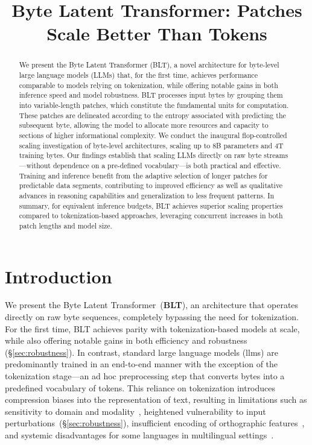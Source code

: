 \title{Byte Latent Transformer: Patches Scale Better Than Tokens}

\begin{abstract}
We present the Byte Latent Transformer ({\textsc BLT}), a novel architecture for byte-level large language models (LLMs) that, for the first time, achieves performance comparable to models relying on tokenization, while offering notable gains in both inference speed and model robustness. {\textsc BLT} processes input bytes by grouping them into variable-length patches, which constitute the fundamental units for computation. These patches are delineated according to the entropy associated with predicting the subsequent byte, allowing the model to allocate more resources and capacity to sections of higher informational complexity. We conduct the inaugural flop-controlled scaling investigation of byte-level architectures, scaling up to 8B parameters and 4T training bytes. Our findings establish that scaling LLMs directly on raw byte streams—without dependence on a pre-defined vocabulary—is both practical and effective. Training and inference benefit from the adaptive selection of longer patches for predictable data segments, contributing to improved efficiency as well as qualitative advances in reasoning capabilities and generalization to less frequent patterns. In summary, for equivalent inference budgets, {\textsc BLT} achieves superior scaling properties compared to tokenization-based approaches, leveraging concurrent increases in both patch lengths and model size.
\end{abstract}

\section{Introduction}
\label{section:intro}

We present the Byte Latent Transformer~(\textbf{BLT}), an architecture that operates directly on raw byte sequences, completely bypassing the need for tokenization. For the first time, BLT achieves parity with tokenization-based models at scale, while also offering notable gains in both efficiency and robustness (\S\ref{sec:robustness}). In contrast, standard large language models (llms) are predominantly trained in an end-to-end manner with the exception of the tokenization stage—an ad hoc preprocessing step that converts bytes into a predefined vocabulary of tokens. This reliance on tokenization introduces compression biases into the representation of text, resulting in limitations such as sensitivity to domain and modality~\citep{dagangetting}, heightened vulnerability to input perturbations~(\S\ref{sec:robustness}), insufficient encoding of orthographic features~\citep{edman2024cute}, and systemic disadvantages for some languages in multilingual settings~\citep{liang2023xlm,petrov2024language,limisiewicz2024myte}.

